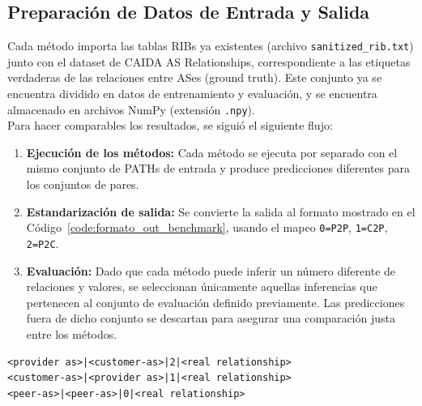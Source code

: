 \subsection{Preparación de Datos de Entrada y Salida}  \label{sec:PreparaciónDatosEntradaSalida}

Cada método importa las tablas RIBs ya existentes (archivo \texttt{sanitized\_rib.txt}) junto con el dataset de CAIDA AS Relationships, correspondiente a las etiquetas verdaderas de las relaciones entre ASes (ground truth). Este conjunto ya se encuentra dividido en datos de entrenamiento y evaluación, y se encuentra almacenado en archivos NumPy (extensión \texttt{.npy}).\\



Para hacer comparables los resultados, se siguió el siguiente flujo:


\begin{enumerate}[label=\alph*)]
    \item \textbf{Ejecución de los métodos:} Cada método se ejecuta por separado con el mismo conjunto de PATHs de entrada y produce predicciones diferentes para los conjuntos de pares.
  
    \item \textbf{Estandarización de salida:} Se convierte la salida al formato mostrado en el Código~\ref{code:formato_out_benchmark}, usando el mapeo \texttt{0=P2P}, \texttt{1=C2P}, \texttt{2=P2C}.

    \item \textbf{Evaluación:} Dado que cada método puede inferir un número diferente de relaciones y valores, se seleccionan únicamente aquellas inferencias que pertenecen al conjunto de evaluación definido previamente. Las predicciones fuera de dicho conjunto se descartan para asegurar una comparación justa entre los métodos.
\end{enumerate}

    

{
\renewcommand{\lstlistingname}{Formato}
\begin{lstlisting}[caption=Salida de los resultados de métodos de inferencia, label=code:formato_out_benchmark]
<provider as>|<customer-as>|2|<real relationship>
<customer-as>|<provider as>|1|<real relationship> 
<peer-as>|<peer-as>|0|<real relationship> 
\end{lstlisting}
}


